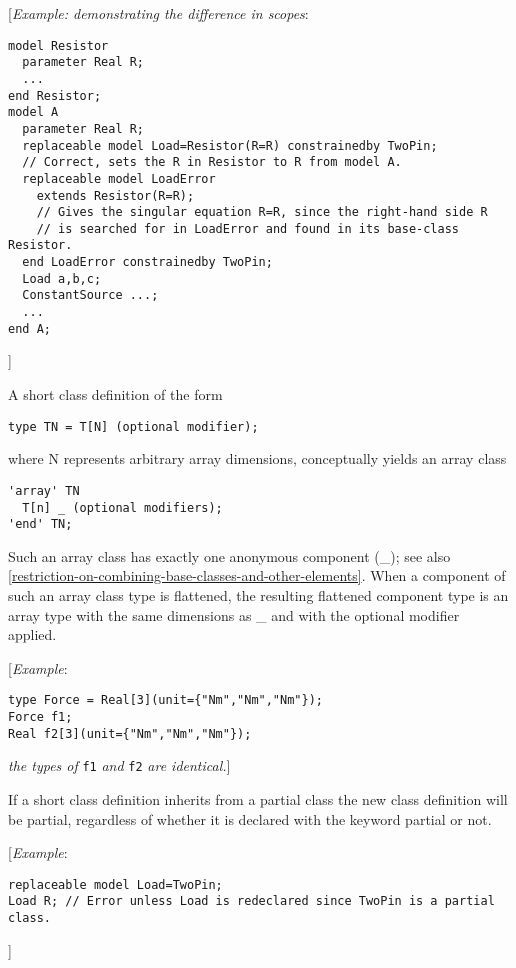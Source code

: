 {[}\emph{Example: demonstrating the difference in scopes}:
\begin{lstlisting}[language=modelica]
model Resistor
  parameter Real R;
  ...
end Resistor;
model A
  parameter Real R;
  replaceable model Load=Resistor(R=R) constrainedby TwoPin;
  // Correct, sets the R in Resistor to R from model A.
  replaceable model LoadError
    extends Resistor(R=R);
    // Gives the singular equation R=R, since the right-hand side R
    // is searched for in LoadError and found in its base-class Resistor.
  end LoadError constrainedby TwoPin;
  Load a,b,c;
  ConstantSource ...;
  ...
end A;
\end{lstlisting}
{]}

A short class definition of the form
\begin{lstlisting}[language=modelica]
type TN = T[N] (optional modifier);
\end{lstlisting}

where N represents arbitrary array dimensions, conceptually yields an
array class

\begin{lstlisting}[language=modelica]
'array' TN
  T[n] _ (optional modifiers);
'end' TN;
\end{lstlisting}

Such an array class has exactly one anonymous component (\_); see also
\autoref{restriction-on-combining-base-classes-and-other-elements}. 
When a component of such an array class type is
flattened, the resulting flattened component type is an array type with
the same dimensions as \_ and with the optional modifier applied.

{[}\emph{Example}:
\begin{lstlisting}[language=modelica]
type Force = Real[3](unit={"Nm","Nm","Nm"});
Force f1;
Real f2[3](unit={"Nm","Nm","Nm"});
\end{lstlisting}
\emph{the types of} \lstinline!f1! \emph{and} \lstinline!f2! \emph{are identical.}{]}

If a short class definition inherits from a partial class the new class
definition will be partial, regardless of whether it is declared with
the keyword partial or not.

{[}\emph{Example}:
\begin{lstlisting}[language=modelica]
replaceable model Load=TwoPin;
Load R; // Error unless Load is redeclared since TwoPin is a partial class.
\end{lstlisting}

{]}

